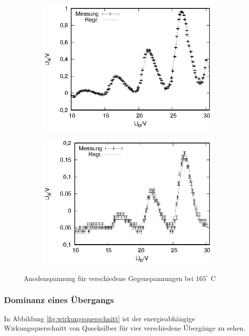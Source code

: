 \begin{figure}[!h]
\begin{subfigure}[h]{0.5\textwidth}
    \includegraphics{data/fh/165K3V.eps}
  \end{subfigure}%
  \begin{subfigure}[h]{0.5\textwidth}
    \centering
    \includegraphics{data/fh/165K4V.eps}
  \end{subfigure}
  \caption{Anodenspannung für verschiedene Gegenspannungen bei $165^\circ$ C}
  \label{fig:kennlinien2}
\end{figure}


\subsubsection{Dominanz eines Übergangs}
In Abbildung \ref{fig:wirkungsquerschnitt} ist der energieabhängige Wirkungsquerschnitt von Quecksilber für vier verschiedene Übergänge zu sehen.
 
